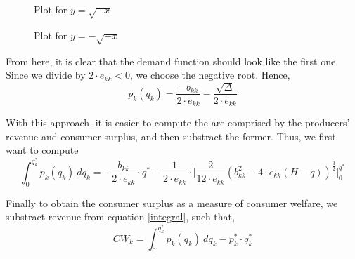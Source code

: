 \documentclass[12pt]{article}
\begin{document}
\begin{figure}[H]
    \begin{minipage}{0.45\textwidth}
\caption{Plot for $y = \sqrt{-x}$}
\end{minipage}\hfill
\begin{minipage}{0.45\textwidth}
\caption{Plot for $y = -\sqrt{-x}$}
    \end{minipage}
\end{figure}

From here, it is clear that the demand function should look like the first one. Since we divide by $2 \cdot e_{kk} <0$, we choose the negative root. Hence,
\begin{equation*}
p_k(q_k) = \frac{-b_{kk}}{2 \cdot e_{kk}} - \frac{\sqrt{\Delta}}{2 \cdot e_{kk}}
\end{equation*}

With this approach, it is easier to compute the are comprised by the producers' revenue and consumer surplus, and then substract the former. Thus, we first want to compute
\begin{equation} \label{integral}
\int_0^{q_k^*} p_k(q_k) \ dq_k = -\frac{b_{kk}}{2 \cdot e_{kk}} \cdot q^* -\frac{1}{2 \cdot e_{kk}} \cdot \bigg[\frac{2}{12 \cdot e_{kk}} (b_{kk}^2 - 4 \cdot e_{kk}(H - q))^{\frac{3}{2}}\bigg]_0^{q^*}
\end{equation}

Finally to obtain the consumer surplus as a measure of consumer welfare, we substract revenue from equation \ref{integral}, such that,
\begin{equation}
CW_k= \int_0^{q_k^*} p_k(q_k) \ dq_k  - p_k^* \cdot q_k^*
\end{equation}

%
\end{document}
